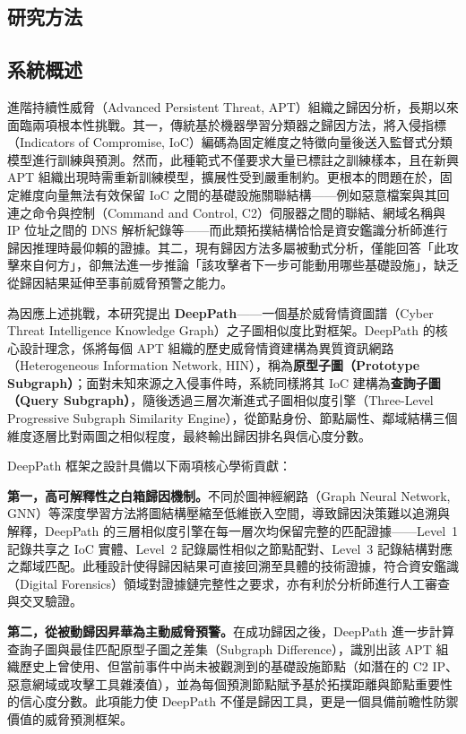 \begin{ZhChapter}

\chapter{研究方法}
\label{ch:methodology}

\section{系統概述}
\label{sec:system-overview}

進階持續性威脅（Advanced Persistent Threat, APT）組織之歸因分析，長期以來面臨兩項根本性挑戰。其一，傳統基於機器學習分類器之歸因方法，將入侵指標（Indicators of Compromise, IoC）編碼為固定維度之特徵向量後送入監督式分類模型進行訓練與預測。然而，此種範式不僅要求大量已標註之訓練樣本，且在新興 APT 組織出現時需重新訓練模型，擴展性受到嚴重制約。更根本的問題在於，固定維度向量無法有效保留 IoC 之間的基礎設施關聯結構——例如惡意檔案與其回連之命令與控制（Command and Control, C2）伺服器之間的聯結、網域名稱與 IP 位址之間的 DNS 解析紀錄等——而此類拓撲結構恰恰是資安鑑識分析師進行歸因推理時最仰賴的證據。其二，現有歸因方法多屬被動式分析，僅能回答「此攻擊來自何方」，卻無法進一步推論「該攻擊者下一步可能動用哪些基礎設施」，缺乏從歸因結果延伸至事前威脅預警之能力。

為因應上述挑戰，本研究提出 \textbf{DeepPath}——一個基於威脅情資圖譜（Cyber Threat Intelligence Knowledge Graph）之子圖相似度比對框架。DeepPath 的核心設計理念，係將每個 APT 組織的歷史威脅情資建構為異質資訊網路（Heterogeneous Information Network, HIN），稱為\textbf{原型子圖（Prototype Subgraph）}；面對未知來源之入侵事件時，系統同樣將其 IoC 建構為\textbf{查詢子圖（Query Subgraph）}，隨後透過三層次漸進式子圖相似度引擎（Three-Level Progressive Subgraph Similarity Engine），從節點身份、節點屬性、鄰域結構三個維度逐層比對兩圖之相似程度，最終輸出歸因排名與信心度分數。

DeepPath 框架之設計具備以下兩項核心學術貢獻：

\textbf{第一，高可解釋性之白箱歸因機制。}不同於圖神經網路（Graph Neural Network, GNN）等深度學習方法將圖結構壓縮至低維嵌入空間，導致歸因決策難以追溯與解釋，DeepPath 的三層相似度引擎在每一層次均保留完整的匹配證據——Level~1 記錄共享之 IoC 實體、Level~2 記錄屬性相似之節點配對、Level~3 記錄結構對應之鄰域匹配。此種設計使得歸因結果可直接回溯至具體的技術證據，符合資安鑑識（Digital Forensics）領域對證據鏈完整性之要求，亦有利於分析師進行人工審查與交叉驗證。

\textbf{第二，從被動歸因昇華為主動威脅預警。}在成功歸因之後，DeepPath 進一步計算查詢子圖與最佳匹配原型子圖之差集（Subgraph Difference），識別出該 APT 組織歷史上曾使用、但當前事件中尚未被觀測到的基礎設施節點（如潛在的 C2 IP、惡意網域或攻擊工具雜湊值），並為每個預測節點賦予基於拓撲距離與節點重要性的信心度分數。此項能力使 DeepPath 不僅是歸因工具，更是一個具備前瞻性防禦價值的威脅預測框架。


\end{ZhChapter}
